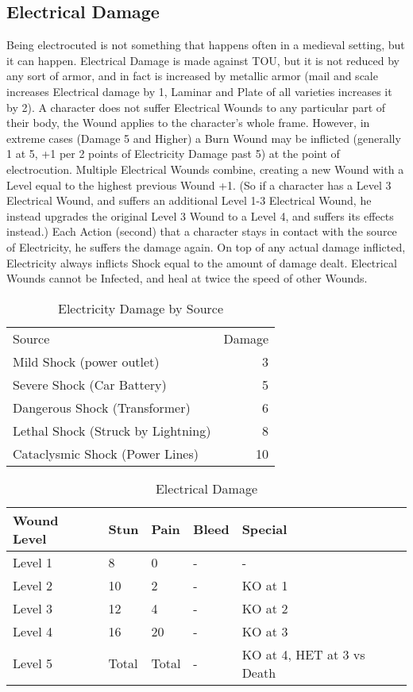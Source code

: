 \documentclass[oneside,11pt,english]{book}
\begin{document}
\subsection{Electrical Damage}
Being electrocuted is not something that happens often in a medieval setting, but it can happen. Electrical 
Damage is made against TOU, but it is not reduced by any sort of armor, and in fact is increased by 
metallic armor (mail and scale increases Electrical damage by 1, Laminar and Plate of all varieties 
increases it by 2).
A character does not suffer Electrical Wounds to any particular part of their body, the Wound applies to 
the character’s whole frame. However, in extreme cases (Damage 5 and Higher) a Burn Wound may be 
inflicted (generally 1 at 5, +1 per 2 points of Electricity Damage past 5) at the point of electrocution. 
Multiple Electrical Wounds combine, creating a new Wound with a Level equal to the highest previous 
Wound +1. (So if a character has a Level 3 Electrical Wound, and suffers an additional Level 1-3 
Electrical Wound, he instead upgrades the original Level 3 Wound to a Level 4, and suffers its effects 
instead.)
Each Action (second) that a character stays in contact with the source of Electricity, he suffers the damage 
again.
On top of any actual damage inflicted, Electricity always inflicts Shock equal to the amount of damage 
dealt.
Electrical Wounds cannot be Infected, and heal at twice the speed of other Wounds. 


\begin{table} %
	\centering
	\caption{Electricity Damage by Source}
	\label{tab:Electricity Damage by Source}
	\begin{tabu} spread 0pt {Xr}
    Source &Damage\\
    Mild Shock (power outlet) &3\\
    Severe Shock (Car Battery)&5\\
    Dangerous Shock (Transformer) &6\\
    Lethal Shock (Struck by Lightning) &8\\
    Cataclysmic Shock (Power Lines) &10\\
	\end{tabu}
\end{table}

\begin{table}[!ht]
	\centering
	\caption{Electrical Damage}
	\label{wound:Electrical Damage}
	\begin{tabu} spread 0pt {X[-1,l] *{3}{X[-3,c]} X[2]}
    Wound Level &Stun &Pain &Bleed &Special\\\toprule %
    Level 1 &8  &0 &- &-\\
    Level 2 &10 &2 &- &KO at 1\\
    Level 3 &12 &4 &- &KO at 2\\
    Level 4 &16 &20 &-&KO at 3\\
    Level 5 &Total &Total &- &KO at 4, HET at 3 vs Death\\
	\end{tabu}
\end{table}
\end{document}
